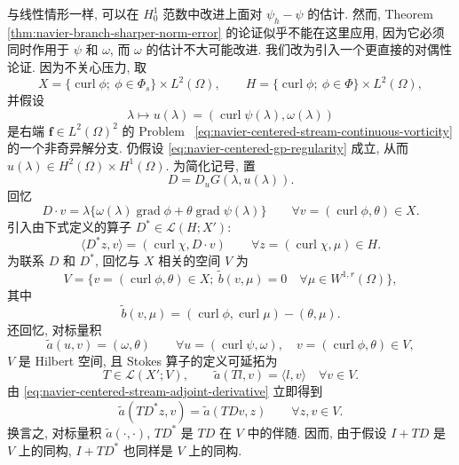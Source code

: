 与线性情形一样, 可以在 $H_0^1$ 范数中改进上面对
$\psi_h-\psi$ 的估计. 然而, Theorem~
\ref{thm:navier-branch-sharper-norm-error} 的论证似乎不能在这里应用,
因为它必须同时作用于 $\psi$ 和 $\omega$, 而 $\omega$ 的估计不大可能改进.
我们改为引入一个更直接的对偶性论证. 因为不关心压力, 取
\[
X=\{\operatorname{curl}\phi;\ \phi\in\Phi_s\}\times L^2(\Omega),
\qquad
H=\{\operatorname{curl}\phi;\ \phi\in\Phi\}\times L^2(\Omega),
\]
并假设
\[
\lambda\longmapsto u(\lambda)
=(\operatorname{curl}\psi(\lambda),\omega(\lambda))
\]
是右端 $\boldsymbol f\in L^2(\Omega)^2$ 的 Problem~
\eqref{eq:navier-centered-stream-continuous-vorticity} 的一个非奇异解分支.
仍假设 \eqref{eq:navier-centered-gp-regularity} 成立, 从而
$u(\lambda)\in H^2(\Omega)\times H^1(\Omega)$. 为简化记号, 置
\[
D=D_uG(\lambda,u(\lambda)).
\]
回忆
\[
D\cdot v
=\lambda\{\omega(\lambda)\operatorname{grad}\phi
+\theta\operatorname{grad}\psi(\lambda)\}
\qquad
\forall v=(\operatorname{curl}\phi,\theta)\in X.
\]
引入由下式定义的算子 $D^*\in\mathcal L(H;X')$:
\begin{equation}\label{eq:navier-centered-stream-adjoint-derivative}
\langle D^*z,v\rangle
=(\operatorname{curl}\chi,D\cdot v)
\qquad
\forall z=(\operatorname{curl}\chi,\mu)\in H.
\end{equation}
为联系 $D$ 和 $D^*$, 回忆与 $X$ 相关的空间 $V$ 为
\[
V=\{v=(\operatorname{curl}\phi,\theta)\in X;
\ \widetilde b(v,\mu)=0
\quad\forall\mu\in W^{1,r}(\Omega)\},
\]
其中
\[
\widetilde b(v,\mu)
=(\operatorname{curl}\phi,\operatorname{curl}\mu)-(\theta,\mu).
\]
还回忆, 对标量积
\[
\widetilde a(u,v)=(\omega,\theta)
\qquad
\forall u=(\operatorname{curl}\psi,\omega),
\quad v=(\operatorname{curl}\phi,\theta)\in V,
\]
$V$ 是 Hilbert 空间, 且 Stokes 算子的定义可延拓为
\[
T\in\mathcal L(X';V),
\qquad
\widetilde a(Tl,v)=\langle l,v\rangle
\quad\forall v\in V.
\]
由 \eqref{eq:navier-centered-stream-adjoint-derivative} 立即得到
\[
\widetilde a(TD^*z,v)=\widetilde a(TDv,z)
\qquad\forall z,v\in V.
\]
换言之, 对标量积 $\widetilde a(\cdot,\cdot)$,
$TD^*$ 是 $TD$ 在 $V$ 中的伴随. 因而, 由于假设 $I+TD$ 是 $V$ 上的同构,
$I+TD^*$ 也同样是 $V$ 上的同构.
